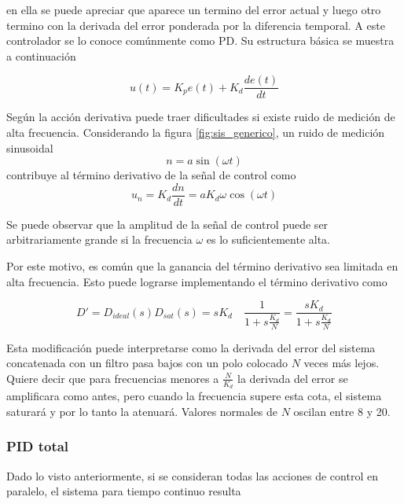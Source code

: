 \documentclass[10pt,conference,a4paper,onecolumn]{article}%
\begin{document}
en ella se puede apreciar que aparece un termino del error actual y luego otro termino con la derivada del error ponderada por la diferencia temporal. A este controlador se lo conoce comúnmente como PD. Su estructura básica se muestra a continuación

\begin{equation}
u(t)=K_pe(t)+K_d\frac{de(t)}{dt}
\end{equation}

Según \cite[pág. 40]{biblia_PID} la acción derivativa puede traer dificultades si existe ruido de medición de alta frecuencia. Considerando la figura \ref{fig:sis_generico}, un ruido de medición sinusoidal
\begin{equation*}
n=a\sin(\omega t)
\end{equation*}
contribuye al término derivativo de la señal de control como
\begin{equation*}
u_n=K_d \frac{dn}{dt}=aK_d\omega\cos(\omega t)
\end{equation*}

Se puede observar que la amplitud de la señal de control puede ser arbitrariamente grande si la frecuencia $\omega$ es lo suficientemente alta.

Por este motivo, es común que la ganancia del término derivativo sea limitada en alta frecuencia. Esto puede lograrse implementando el término derivativo como


\begin{equation}
D'=D_{ideal}(s)D_{sat}(s) =sK_d \quad  \frac{1}{1+s\frac{K_d}{N}} =    \frac{sK_d}{1+s\frac{K_d}{N}}
\label{eq:ajuste_deriv}
\end{equation}

Esta modificación puede interpretarse como la derivada del error del sistema concatenada con un filtro pasa bajos con un polo colocado $N$ veces más lejos. Quiere decir que para frecuencias menores a $\frac{N}{K_d}$ la derivada del error se amplificara como antes, pero cuando la frecuencia supere esta cota, el sistema saturará y por lo tanto la atenuará. Valores normales de $N$ oscilan entre 8 y 20. %

\subsubsection{PID total}

Dado lo visto anteriormente, si se consideran todas las acciones de control en paralelo, el sistema para tiempo continuo resulta
\end{document}
